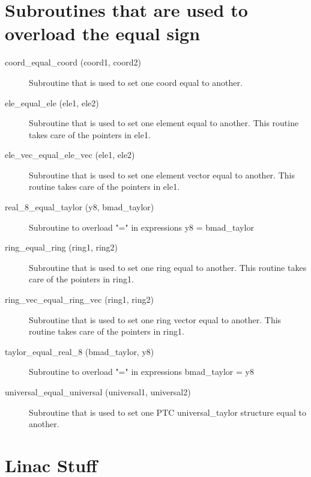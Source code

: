 \section{Subroutines that are used to overload the equal sign}
\label{r:equal}    

\begin{description}

\item[coord\_equal\_coord (coord1, coord2)] \Newline
Subroutine that is used to set one coord equal to another. 

\item[ele\_equal\_ele (ele1, ele2)] \Newline
Subroutine that is used to set one element equal to another. 
This routine takes care of the pointers in ele1. 

\item[ele\_vec\_equal\_ele\_vec (ele1, ele2)] \Newline
Subroutine that is used to set one element vector equal to another. 
This routine takes care of the pointers in ele1. 

\item[real\_8\_equal\_taylor (y8, bmad\_taylor)] \Newline
Subroutine to overload "=" in expressions y8 = bmad\_taylor 

\item[ring\_equal\_ring (ring1, ring2)] \Newline
Subroutine that is used to set one ring equal to another. 
This routine takes care of the pointers in ring1. 

\item[ring\_vec\_equal\_ring\_vec (ring1, ring2)] \Newline
Subroutine that is used to set one ring vector equal to another. 
This routine takes care of the pointers in ring1. 

\item[taylor\_equal\_real\_8 (bmad\_taylor, y8)] \Newline
Subroutine to overload "=" in expressions bmad\_taylor = y8 

\item[universal\_equal\_universal (universal1, universal2)] \Newline
Subroutine that is used to set one PTC universal\_taylor 
structure equal to another. 

\end{description}

\section{Linac Stuff}
\label{r:linac}    

